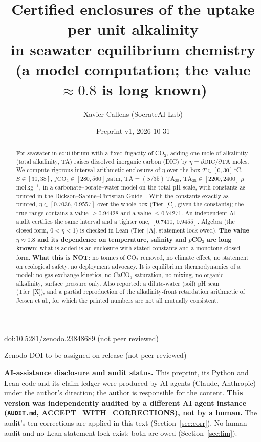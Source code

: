 \documentclass[10pt]{article}
\title{Certified enclosures of the \COtwo{} uptake per unit alkalinity\\
in seawater equilibrium chemistry\\
{\large (a model computation; the value $\approx0.8$ is long known)}}
\author{Xavier Callens (SocrateAI Lab)}
\date{Preprint v1, 2026-10-31}
\newcommand{\tier}[1]{\textsf{[#1]}}
\newcommand{\tA}{\tier{A}}
\newcommand{\tC}{\tier{C}}
\newcommand{\tX}{\tier{X}}
\newcommand{\COtwo}{CO$_2$}
\begin{document}
\maketitle
\begin{center}\small doi:10.5281/zenodo.23848689 \quad (not peer reviewed)\end{center}

\begin{center}\small Zenodo DOI to be assigned on release \quad (not peer reviewed)\end{center}

\noindent\textbf{AI-assistance disclosure and audit status.} This preprint, its Python and Lean code and its claim ledger were
produced by AI agents (Claude, Anthropic) under the author's direction; the author is responsible for the content.
\textbf{This version was independently audited by a different AI agent instance (\texttt{AUDIT.md}, ACCEPT\_WITH\_CORRECTIONS), not by a human.}
The audit's ten corrections are applied in this text (Section~\ref{sec:corr}). No human audit and no Lean statement lock exist; both are owed (Section~\ref{sec:lim}).

\begin{abstract}
For seawater in equilibrium with a fixed fugacity of \COtwo{}, adding one mole of alkalinity (total alkalinity, TA) raises dissolved inorganic carbon (DIC) by
$\eta=\partial\mathrm{DIC}/\partial\mathrm{TA}$ moles. We compute rigorous interval-arithmetic enclosures of $\eta$ over the box
$T\in[0,30]\,^\circ$C, $S\in[30,38]$, $f\mathrm{CO_2}\in[280,560]\,\mu$atm, $\mathrm{TA}=(S/35)\,\mathrm{TA}_{35}$, $\mathrm{TA}_{35}\in[2200,2400]\ \mu$mol\,kg$^{-1}$,
in a carbonate--borate--water model on the total pH scale, with constants as printed in the Dickson--Sabine--Christian Guide~\cite{guide}.
With the constants exactly as printed, $\eta\in[0.7036,\,0.9557]$ over the whole box (Tier~\tC{}, given the constants); the true range contains a value $\ge0.94428$ and a value $\le0.74271$.
An independent AI audit certifies the same interval and a tighter one, $[0.7410,\,0.9455]$. Algebra (the closed form, $0<\eta<1$) is checked in Lean (Tier~\tA{}, statement lock owed).
\textbf{The value $\eta\approx0.8$ and its dependence on temperature, salinity and $p$\COtwo{} are long known}; what is added is an enclosure with stated constants and a monotone closed form.
\textbf{What this is NOT:} no tonnes of \COtwo{} removed, no climate effect, no statement on ecological safety, no deployment advocacy. It is equilibrium thermodynamics of a model: no gas-exchange kinetics, no CaCO$_3$ saturation, no mixing, no organic alkalinity, surface pressure only.
Also reported: a dilute-water (soil) pH scan (Tier~\tX{}), and a partial reproduction of the alkalinity-front retardation arithmetic of Jessen et al., for which the printed numbers are not all mutually consistent.
\end{abstract}
\end{document}
